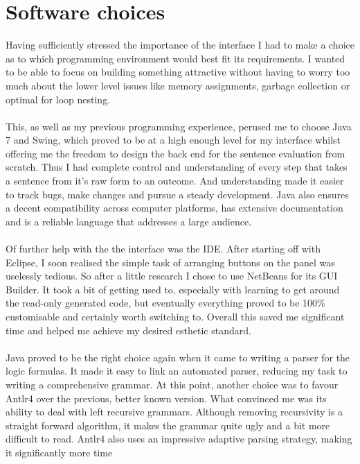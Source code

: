 \documentclass{report}
\begin{document}
\section{Software choices}
Having sufficiently stressed the importance of the interface I had to make a 
choice as to which programming environment would best fit its requirements. I 
wanted to be able to focus on building something attractive without having to 
worry too much about the lower level issues like memory assignments, garbage 
collection or optimal for loop nesting. 
\\ \\
This, as well as my previous programming experience, 
perused me to choose Java 7\cite{javaAPI} and Swing\cite{javaTUT}, which 
proved to be at a high enough level for my interface whilst offering me 
the freedom to design the back end for the sentence evaluation from scratch. 
Thus I had complete control and understanding of every step that takes a 
sentence from it's raw form to an outcome. And understanding made it easier to 
track bugs, make changes and pursue a steady development. Java also ensures a 
decent compatibility across computer platforms, has extensive documentation and 
is a reliable language that addresses a large audience. 
\\ \\
Of further help with the the interface was the IDE. After starting off with 
Eclipse, I soon realised the simple task of arranging buttons on the panel was 
uselessly tedious. So after a little research I chose to use NetBeans for its 
GUI Builder. It took a bit of getting used to, especially with learning to get 
around the read-only generated code, but eventually everything proved to be 
100\% customisable and certainly worth switching to. Overall this saved me 
significant time and helped me achieve my desired esthetic standard. 
\\ \\
Java proved to be the right choice again when it came to writing a parser for 
the logic formulas. It made it easy to link an automated parser, reducing my 
task to writing a comprehensive grammar. At this point, another choice was to 
favour Antlr4\cite{antlr4} over the previous, better known version. What 
convinced me was its ability to deal with left recursive grammars. Although 
removing recursivity is a straight forward algorithm\cite{compilers}, it makes 
the grammar quite ugly and a bit more difficult to read. Antlr4 also uses an 
impressive adaptive parsing strategy, making it significantly more time 
\end{document}
